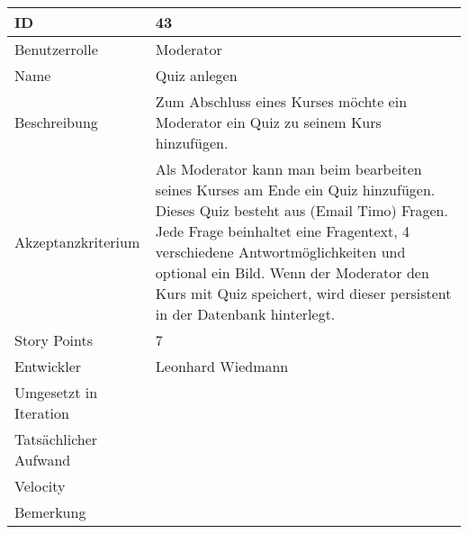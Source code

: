 \begin{tabularx}{\textwidth}{|p{}|X|}
	\hline
	ID & 43\\
	\hline
	Benutzerrolle & Moderator\\
	\hline
	Name & Quiz anlegen\\
	\hline
	Beschreibung & Zum Abschluss eines Kurses möchte ein Moderator ein Quiz zu seinem Kurs hinzufügen. \\
	\hline
	Akzeptanzkriterium & Als Moderator kann man beim bearbeiten seines Kurses am Ende ein Quiz hinzufügen. Dieses Quiz besteht aus (Email Timo) Fragen. Jede Frage beinhaltet eine Fragentext, 4 verschiedene Antwortmöglichkeiten und optional ein Bild. Wenn der Moderator den Kurs mit Quiz speichert, wird dieser persistent in der Datenbank hinterlegt.\\
	\hline
	Story Points & 7\\
	\hline
	Entwickler & Leonhard Wiedmann\\
	\hline
	Umgesetzt in Iteration & \\
	\hline
	Tatsächlicher Aufwand & \\
	\hline
	Velocity & \\
	\hline
	Bemerkung & \\
	\hline
\end{tabularx}
\vspace{20pt}
